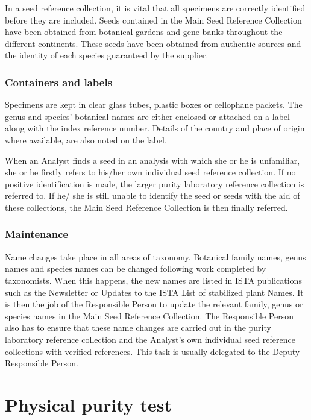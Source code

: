 \documentclass[]{book}
\begin{document}
In a seed reference collection, it is vital that all specimens are
correctly identified before they are included. Seeds contained in the
Main Seed Reference Collection have been obtained from botanical gardens
and gene banks throughout the different continents. These seeds have
been obtained from authentic sources and the identity of each species
guaranteed by the supplier.

\subsection{Containers and labels}\label{containers-and-labels}

Specimens are kept in clear glass tubes, plastic boxes or cellophane
packets. The genus and species' botanical names are either enclosed or
attached on a label along with the index reference number. Details of
the country and place of origin where available, are also noted on the
label.

When an Analyst finds a seed in an analysis with which she or he is
unfamiliar, she or he firstly refers to his/her own individual seed
reference collection. If no positive identification is made, the larger
purity laboratory reference collection is referred to. If he/ she is
still unable to identify the seed or seeds with the aid of these
collections, the Main Seed Reference Collection is then finally
referred.

\subsection{Maintenance}\label{maintenance}

Name changes take place in all areas of taxonomy. Botanical family
names, genus names and species names can be changed following work
completed by taxonomists. When this happens, the new names are listed in
ISTA publications such as the Newsletter or Updates to the ISTA List of
stabilized plant Names. It is then the job of the Responsible Person to
update the relevant family, genus or species names in the Main Seed
Reference Collection. The Responsible Person also has to ensure that
these name changes are carried out in the purity laboratory reference
collection and the Analyst's own individual seed reference collections
with verified references. This task is usually delegated to the Deputy
Responsible Person.

\chapter{Physical purity test}\label{physical-purity-test}
\end{document}
